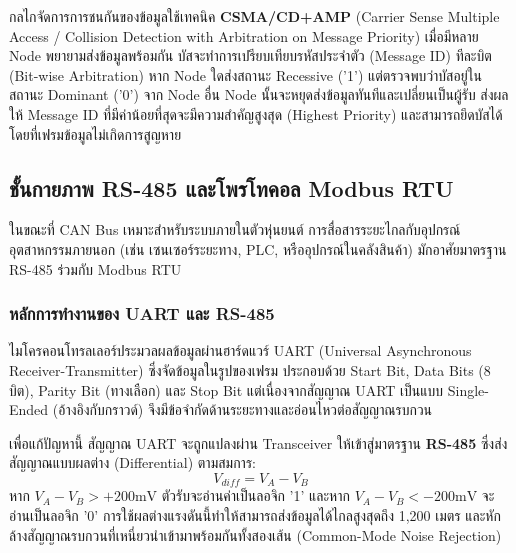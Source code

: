 กลไกจัดการการชนกันของข้อมูลใช้เทคนิค \textbf{CSMA/CD+AMP} (Carrier Sense Multiple Access / Collision Detection with Arbitration on Message Priority) เมื่อมีหลาย Node พยายามส่งข้อมูลพร้อมกัน บัสจะทำการเปรียบเทียบรหัสประจำตัว (Message ID) ทีละบิต (Bit-wise Arbitration) หาก Node ใดส่งสถานะ Recessive ('1') แต่ตรวจพบว่าบัสอยู่ในสถานะ Dominant ('0') จาก Node อื่น Node นั้นจะหยุดส่งข้อมูลทันทีและเปลี่ยนเป็นผู้รับ ส่งผลให้ Message ID ที่มีค่าน้อยที่สุดจะมีความสำคัญสูงสุด (Highest Priority) และสามารถยึดบัสได้โดยที่เฟรมข้อมูลไม่เกิดการสูญหาย


\subsection{ชั้นกายภาพ RS-485 และโพรโทคอล Modbus RTU}

ในขณะที่ CAN Bus เหมาะสำหรับระบบภายในตัวหุ่นยนต์ การสื่อสารระยะไกลกับอุปกรณ์อุตสาหกรรมภายนอก (เช่น เซนเซอร์ระยะทาง, PLC, หรืออุปกรณ์ในคลังสินค้า) มักอาศัยมาตรฐาน RS-485 ร่วมกับ Modbus RTU

\subsubsection{หลักการทำงานของ UART และ RS-485}
ไมโครคอนโทรลเลอร์ประมวลผลข้อมูลผ่านฮาร์ดแวร์ UART (Universal Asynchronous Receiver-Transmitter) ซึ่งจัดข้อมูลในรูปของเฟรม ประกอบด้วย Start Bit, Data Bits (8 บิต), Parity Bit (ทางเลือก) และ Stop Bit แต่เนื่องจากสัญญาณ UART เป็นแบบ Single-Ended (อ้างอิงกับกราวด์) จึงมีข้อจำกัดด้านระยะทางและอ่อนไหวต่อสัญญาณรบกวน 

เพื่อแก้ปัญหานี้ สัญญาณ UART จะถูกแปลงผ่าน Transceiver ให้เข้าสู่มาตรฐาน \textbf{RS-485} ซึ่งส่งสัญญาณแบบผลต่าง (Differential) ตามสมการ:
\begin{equation}
    V_{diff} = V_A - V_B
\end{equation}
\noindent หาก $V_A - V_B > +200\text{mV}$ ตัวรับจะอ่านค่าเป็นลอจิก '1' และหาก $V_A - V_B < -200\text{mV}$ จะอ่านเป็นลอจิก '0' การใช้ผลต่างแรงดันนี้ทำให้สามารถส่งข้อมูลได้ไกลสูงสุดถึง 1,200 เมตร และหักล้างสัญญาณรบกวนที่เหนี่ยวนำเข้ามาพร้อมกันทั้งสองเส้น (Common-Mode Noise Rejection)

